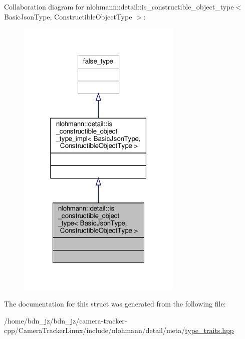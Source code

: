 Collaboration diagram for nlohmann\+:\+:detail\+:\+:is\+\_\+constructible\+\_\+object\+\_\+type$<$ Basic\+Json\+Type, Constructible\+Object\+Type $>$\+:\nopagebreak
\begin{figure}[H]
\begin{center}
\leavevmode
\includegraphics[width=223pt]{structnlohmann_1_1detail_1_1is__constructible__object__type__coll__graph}
\end{center}
\end{figure}


The documentation for this struct was generated from the following file\+:\begin{DoxyCompactItemize}
\item 
/home/bdn\+\_\+jz/bdn\+\_\+jz/camera-\/tracker-\/cpp/\+Camera\+Tracker\+Linux/include/nlohmann/detail/meta/\hyperlink{type__traits_8hpp}{type\+\_\+traits.\+hpp}\end{DoxyCompactItemize}
